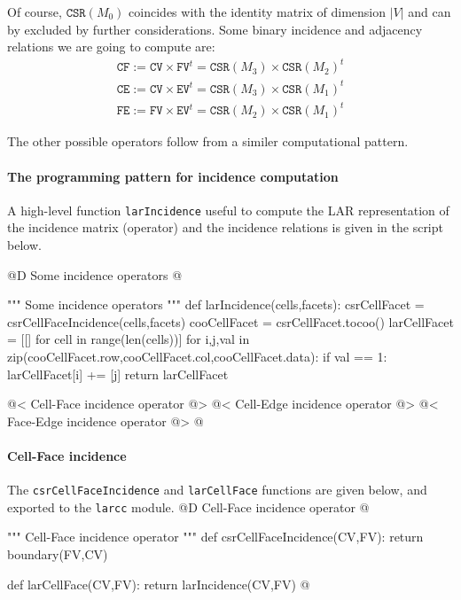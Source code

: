 \documentclass[11pt,oneside]{article}	%
\begin{document}
Of course, $\texttt{CSR}(M_0)$ coincides with the identity matrix of dimension $|V|$ and can by excluded by further considerations.
Some binary incidence and adjacency relations we are going to compute are:
\begin{align}
\texttt{CF} := \texttt{CV} \times \texttt{FV}^t = \texttt{CSR}(M_3)\times\texttt{CSR}(M_2)^t \\
\texttt{CE} := \texttt{CV} \times \texttt{EV}^t = \texttt{CSR}(M_3)\times\texttt{CSR}(M_1)^t \\
\texttt{FE} := \texttt{FV} \times \texttt{EV}^t = \texttt{CSR}(M_2)\times\texttt{CSR}(M_1)^t 
\end{align}

The other possible operators follow from a similer computational pattern.

\paragraph{The programming pattern for incidence computation}

A high-level function \texttt{larIncidence} useful to compute the LAR representation of the incidence matrix (operator) and the incidence relations is given in the script below.

@D Some incidence operators
@{""" Some incidence operators """
def larIncidence(cells,facets):
	csrCellFacet = csrCellFaceIncidence(cells,facets)
	cooCellFacet = csrCellFacet.tocoo()
	larCellFacet = [[] for cell in range(len(cells))]
	for i,j,val in zip(cooCellFacet.row,cooCellFacet.col,cooCellFacet.data):
		if val == 1: larCellFacet[i] += [j]
	return larCellFacet

@< Cell-Face incidence operator @>
@< Cell-Edge incidence operator @>
@< Face-Edge incidence operator @>
@}


\paragraph{Cell-Face incidence}
The \texttt{csrCellFaceIncidence} and \texttt{larCellFace} functions are given below, and exported to the \texttt{larcc} module.
@D Cell-Face incidence operator
@{""" Cell-Face incidence operator """
def csrCellFaceIncidence(CV,FV):
	return boundary(FV,CV)

def larCellFace(CV,FV):
	return larIncidence(CV,FV)
@}
\end{document}
